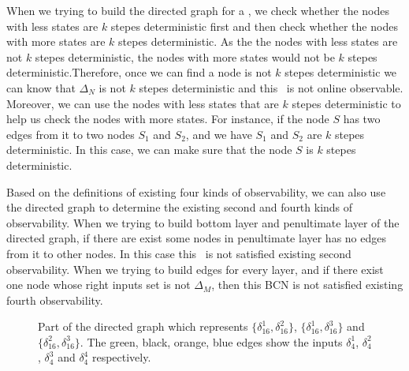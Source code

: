 When we trying to build the directed graph for a \BCN, we check whether the nodes with less states are $k$ stepes deterministic first and then check whether the nodes with more states are $k$ stepes deterministic.  As the the nodes with less states are not $k$ stepes deterministic, the nodes with more states would not be $k$ stepes deterministic.Therefore, once we can find a node is not $k$ stepes deterministic we can know that $\Delta_N$ is not $k$ stepes deterministic and this \BCN\ is not online observable. Moreover, we can use the nodes with less states that are $k$ stepes deterministic to help us check the nodes with more states. For instance, if the node $S$ has two edges from it to two nodes $S_1$ and $S_2$, and we have $S_1$ and $S_2$ are $k$ stepes deterministic. In this case, we can make sure that the node $S$ is $k$ stepes deterministic.

Based on the definitions of existing four kinds of observability, we can also use the directed graph to determine the existing second and fourth kinds of observability. When we trying to build bottom layer and penultimate layer of the directed graph, if there are exist some nodes in penultimate layer has no edges from it to other nodes. In this case this \BCN\ is not satisfied existing second observability. When we trying to build edges for every layer, and if there exist one node whose right inputs set is not $\Delta_M$, then this BCN is not satisfied existing fourth observability.
\begin{figure}[thpb]
      \centering
      
      \caption{Part of the directed graph which represents $\{\delta_{16}^1,\delta_{16}^2\}$, $\{\delta_{16}^1,\delta_{16}^3\}$ and $\{\delta_{16}^2,\delta_{16}^3\}$. The green, black, orange, blue edges show the inputs $\delta_4^1$, $\delta_4^2$, $\delta_4^3$ and $\delta_4^4$ respectively.}
      \label{fig:4}
   \end{figure}
